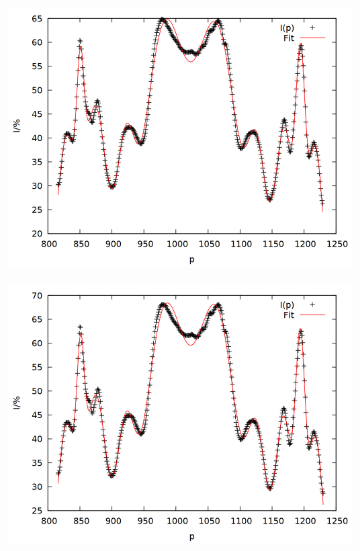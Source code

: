 \begin{figure}
\begin{subfigure}{0.45\textwidth}
\includegraphics[width=\textwidth]{data/zeeman/out_7_2.png}
\end{subfigure}
\begin{subfigure}{0.45\textwidth}
\includegraphics[width=\textwidth]{data/zeeman/out_7_5.png}
\end{subfigure}
\begin{subfigure}{0.45\textwidth}

\end{subfigure}
\end{figure}
